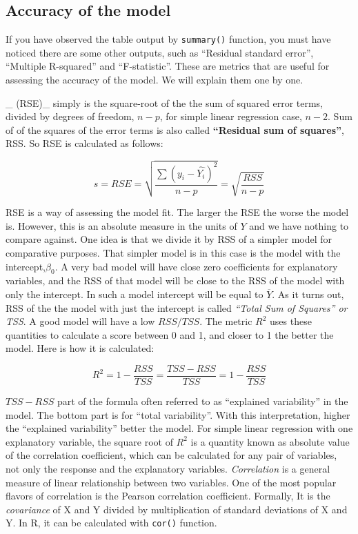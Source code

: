 \documentclass[12pt,]{krantz}
\theoremstyle{definition}
\theoremstyle{definition}
\theoremstyle{definition}
\theoremstyle{remark}
\begin{document}
\hypertarget{accuracy-of-the-model}{%
\subsection{Accuracy of the model}\label{accuracy-of-the-model}}

If you have observed the table output by \texttt{summary()} function,
you must have noticed there are some other outputs, such as ``Residual
standard error'', ``Multiple R-squared'' and ``F-statistic''. These are
metrics that are useful for assessing the accuracy of the model. We will
explain them one by one.

\_ (RSE)\_ simply is the square-root of the the sum of squared error
terms, divided by degrees of freedom, \(n-p\), for simple linear
regression case, \(n-2\). Sum of of the squares of the error terms is
also called \textbf{``Residual sum of squares''}, RSS. So RSE is
calculated as follows:

\[ s=RSE=\sqrt{\frac{\sum{(y_i-\hat{Y_i})^2 }}{n-p}}=\sqrt{\frac{RSS}{n-p}}\]

RSE is a way of assessing the model fit. The larger the RSE the worse
the model is. However, this is an absolute measure in the units of \(Y\)
and we have nothing to compare against. One idea is that we divide it by
RSS of a simpler model for comparative purposes. That simpler model is
in this case is the model with the intercept,\(\beta_0\). A very bad
model will have close zero coefficients for explanatory variables, and
the RSS of that model will be close to the RSS of the model with only
the intercept. In such a model intercept will be equal to
\(\overline{Y}\). As it turns out, RSS of the the model with just the
intercept is called \emph{``Total Sum of Squares'' or TSS}. A good model
will have a low \(RSS/TSS\). The metric \(R^2\) uses these quantities to
calculate a score between 0 and 1, and closer to 1 the better the model.
Here is how it is calculated:

\[R^2=1-\frac{RSS}{TSS}=\frac{TSS-RSS}{TSS}=1-\frac{RSS}{TSS}\]

\(TSS-RSS\) part of the formula often referred to as ``explained
variability'' in the model. The bottom part is for ``total
variability''. With this interpretation, higher the ``explained
variability'' better the model. For simple linear regression with one
explanatory variable, the square root of \(R^2\) is a quantity known as
absolute value of the correlation coefficient, which can be calculated
for any pair of variables, not only the response and the explanatory
variables. \emph{Correlation} is a general measure of linear
relationship between two variables. One of the most popular flavors of
correlation is the Pearson correlation coefficient. Formally, It is the
\emph{covariance} of X and Y divided by multiplication of standard
deviations of X and Y. In R, it can be calculated with \texttt{cor()}
function.
\end{document}
